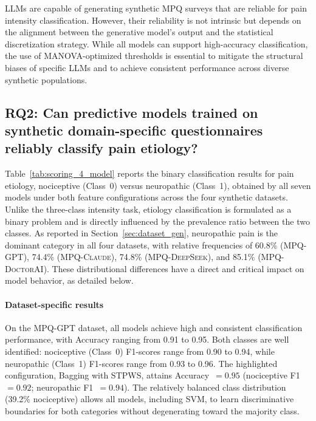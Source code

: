 \documentclass[preprint,12pt,authoryear]{elsarticle}
\newcommand{\dbGPT}{\small\textsc{MPQ-GPT}\xspace}
\newcommand{\dbClaude}{\small\textsc{MPQ-Claude}\xspace}
\newcommand{\dbDeepSeek}{\small\textsc{MPQ-DeepSeek}\xspace}
\newcommand{\dbDoctorAI}{\small\textsc{MPQ-DoctorAI}\xspace}
\begin{document}
\begin{tcolorbox}[colback=blue!5!white, colframe=blue!50!black, fonttitle=\bfseries, 
title=Answer to RQ1, fontupper=\setstretch{0.7}]
LLMs are capable of generating synthetic MPQ surveys that are reliable for pain intensity classification. However, their reliability is not intrinsic but depends on the alignment between the generative model's output and the statistical discretization strategy. While all models can support high-accuracy classification, the use of MANOVA-optimized thresholds is essential to mitigate the structural biases of specific LLMs and to achieve consistent performance across diverse synthetic populations.
\end{tcolorbox}


\subsection{RQ2: Can predictive models trained on synthetic domain-specific questionnaires reliably classify pain etiology?}
Table~\ref{tab:scoring_4_model} reports the binary classification results for pain etiology, nociceptive (Class~0) versus neuropathic (Class~1), obtained by all seven models under both feature configurations across the four synthetic datasets. Unlike the three-class intensity task, etiology classification is formulated as a binary problem and is directly influenced by the prevalence ratio between the two classes. As reported in Section~\ref{sec:dataset_gen}, neuropathic pain is the dominant category in all four datasets, with relative frequencies of 60.8\% (\dbGPT), 74.4\% (\dbClaude), 74.8\% (\dbDeepSeek), and 85.1\% (\dbDoctorAI). These distributional differences have a direct and critical impact on model behavior, as detailed below.

\paragraph{Dataset-specific results} On the \dbGPT dataset, all models achieve high and consistent classification performance, with Accuracy ranging from 0.91 to 0.95. Both classes are well identified: nociceptive (Class~0) F1-scores range from 0.90 to 0.94, while neuropathic (Class~1) F1-scores range from 0.93 to 0.96. The highlighted configuration, Bagging with STPWS, attains Accuracy~$= 0.95$ (nociceptive F1~$= 0.92$; neuropathic F1~$= 0.94$). The relatively balanced class distribution (39.2\% nociceptive) allows all models, including SVM, to learn discriminative boundaries for both categories without degenerating toward the majority class.
\end{document}
